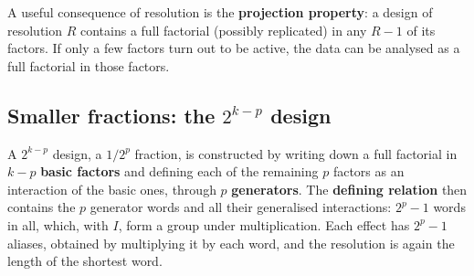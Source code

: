 \documentclass[11pt,a4paper]{article}
\numberwithin{equation}{section}
\theoremstyle{definition}
\begin{document}
A useful consequence of resolution is the \textbf{projection property}: a design of resolution $R$ contains a full factorial (possibly replicated) in
any $R - 1$ of its factors. If only a few factors turn out to be active, the data can be analysed as a full factorial in those factors.

\subsection{Smaller fractions: the $2^{k-p}$ design}
A $2^{k-p}$ design, a $1/2^p$ fraction, is constructed by writing down a full factorial in $k - p$ \textbf{basic factors} and defining each of the remaining $p$
factors as an interaction of the basic ones, through $p$ \textbf{generators}. The \textbf{defining relation} then contains the $p$ generator words and all
their generalised interactions: $2^p - 1$ words in all, which, with $I$, form a group under multiplication. Each effect has $2^p - 1$ aliases, obtained by
multiplying it by each word, and the resolution is again the length of the shortest word.
\end{document}
